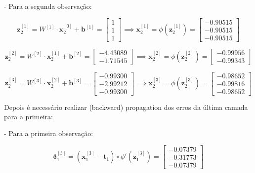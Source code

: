 \documentclass[a4paper,12pt]{article} %
\begin{document}
\begin{enumerate}
- Para a segunda observação:

\begin{equation*}
    \textbf{z}^{[1]}_2 = W^{[1]} \cdot \textbf{x}^{[0]}_2 + \textbf{b}^{[1]} = \begin{bmatrix} 1 \\ 1 \\ 1 \end{bmatrix} \implies \textbf{x}^{[1]}_2 = \phi(\textbf{z}^{[1]}_2)= \begin{bmatrix} -0.90515 \\ -0.90515 \\ -0.90515 \end{bmatrix}
\end{equation*}

\begin{equation*}
    \textbf{z}^{[2]}_2 = W^{[2]} \cdot \textbf{x}^{[1]}_2 + \textbf{b}^{[2]} = \begin{bmatrix} -4.43089 \\ -1.71545 \end{bmatrix} \implies \textbf{x}^{[2]}_2 = \phi(\textbf{z}^{[2]}_2)= \begin{bmatrix} -0.99956 \\ -0.99343 \end{bmatrix}
\end{equation*}

\begin{equation*}
    \textbf{z}^{[3]}_2 = W^{[3]} \cdot \textbf{x}^{[2]}_2 + \textbf{b}^{[3]} = \begin{bmatrix} -0.99300 \\ -2.99212 \\ -0.99300 \end{bmatrix} \implies \textbf{x}^{[3]}_2 = \phi(\textbf{z}^{[3]}_2)= \begin{bmatrix} -0.98652 \\ -0.99816\\ -0.98652 \end{bmatrix}
\end{equation*}

Depois é necessário realizar (backward) propagation dos erros da última camada para a primeira:

- Para a primeira observação:

\begin{equation*}
    \bm{\delta}^{[3]}_1 = (\textbf{x}^{[3]}_1 - \textbf{t}_1) \circ \phi'(\textbf{z}^{[3]}_1) = \begin{bmatrix} -0.07379 \\ -0.31773 \\ -0.07379 \end{bmatrix}
\end{equation*}


\end{enumerate}
\end{document}
